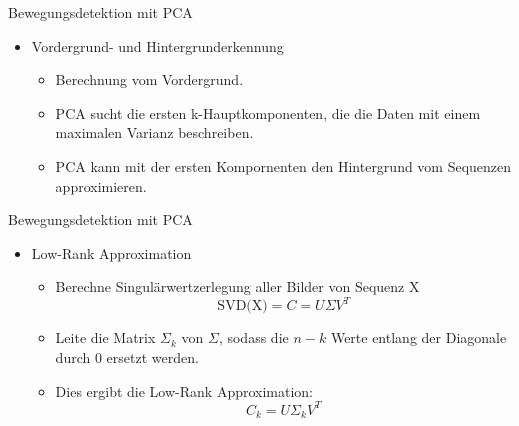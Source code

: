 \begin{frame}[t,fragile]{Bewegungsdetektion mit  PCA}
	\begin{itemize}
 \item Vordergrund- und Hintergrunderkennung
 \begin{itemize}
        \item{Berechnung vom Vordergrund.}
  \item{PCA sucht die ersten k-Hauptkomponenten, die die Daten mit einem maximalen Varianz beschreiben.}
 \item{PCA kann mit der ersten Kompornenten den Hintergrund vom Sequenzen approximieren.}
  \end{itemize}
    \end{itemize}
\end{frame}


\begin{frame}[t,fragile]{Bewegungsdetektion mit PCA}
	\begin{itemize}
    \item{Low-Rank Approximation}
\begin{itemize}
    
 \item{Berechne Singulärwertzerlegung aller Bilder von Sequenz X}
 \begin{equation}
\text{SVD(X)}= C = U\Sigma V^T
\end{equation}
 \item{Leite die Matrix ${\Sigma_k}$ von ${\Sigma}$, sodass die ${n - k}$ Werte entlang der Diagonale durch 0 ersetzt werden.}
 \item{Dies ergibt die Low-Rank Approximation:}
\begin{equation}
C_k = U\Sigma_kV^T
\end{equation}

      \end{itemize}
  \end{itemize}
\end{frame}


